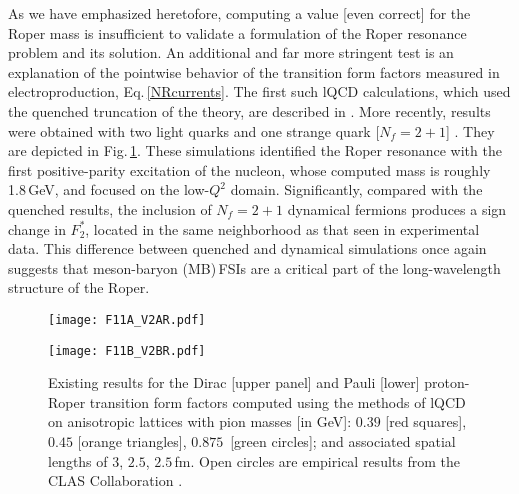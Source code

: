 As we have emphasized heretofore, computing a value [even correct] for the Roper mass is insufficient to validate a formulation of the Roper resonance problem and its solution.  An additional and far more stringent test is an explanation of the pointwise behavior of the transition form factors measured in electroproduction, Eq.\,\eqref{NRcurrents}.  The first such lQCD calculations, which used the quenched truncation of the theory, are described in \cite{Lin:2008qv}.   More recently, results were obtained with two light quarks and one strange quark [$N_f = 2 + 1$] \cite{Lin:2011da}.  They are depicted in Fig.\,\ref{lQCDelectroRoper}.  These simulations identified the Roper resonance with the first positive-parity excitation of the nucleon, whose computed mass is roughly 1.8\,GeV, and focused on the low-$Q^2$ domain.  Significantly, compared with the quenched results, the inclusion of $N_f = 2 + 1$ dynamical fermions produces a sign change in $F_2^\ast$, located in the same neighborhood as that seen in experimental data.  This difference between quenched and dynamical simulations once again suggests that meson-baryon (MB)\,FSIs are a critical part of the long-wavelength structure of the Roper.

\begin{figure}[!t]

\centerline{%
\texttt{[image: F11A\_V2AR.pdf]}}
\vspace*{1ex}

\centerline{%
\texttt{[image: F11B\_V2BR.pdf]}}
%
\caption{\label{lQCDelectroRoper}
%
Existing results for the Dirac [upper panel] and Pauli [lower] proton-Roper transition form factors computed using the methods of lQCD \cite{Lin:2011da} on anisotropic lattices with pion masses [in GeV]: $0.39$ [red squares], $0.45$ [orange triangles], $0.875\,$ [green circles]; and associated spatial lengths of $3$, $2.5$, $2.5\,$fm.
%
Open circles are empirical results from the CLAS Collaboration \cite{Aznauryan:2009mx, Dugger:2009pn, Mokeev:2012vsa, Mokeev:2015lda}. }
\end{figure}


